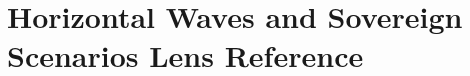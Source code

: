 \documentclass[11pt,a4paper]{book}
\newif\ifusebiblatex
\DeclareRobustCommand{\_}{\ifmmode\text{\symbol{95}}\else\symbol{95}\allowbreak\fi}
\theoremstyle{plain}
\theoremstyle{definition}
\begin{document}
\part{Horizontal Waves and Sovereign Scenarios Lens Reference}








\backmatter
\ifusebiblatex
    \printbibliography[heading=bibintoc]
\else
    \cleardoublepage
    
    
\fi
\end{document}
